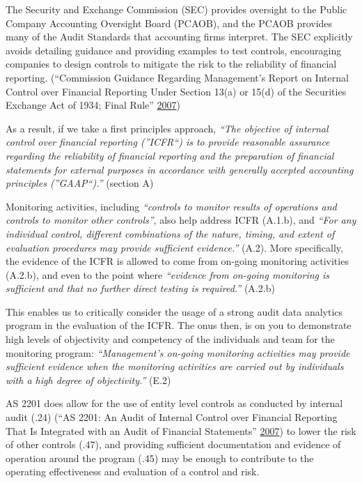 \documentclass[
]{book}
\begin{document}
The Security and Exchange Commission (SEC) provides oversight to the Public Company Accounting Oversight Board (PCAOB), and the PCAOB provides many of the Audit Standards that accounting firms interpret. The SEC explicitly avoids detailing guidance and providing examples to test controls, encouraging companies to design controls to mitigate the risk to the reliability of financial reporting. (``Commission Guidance Regarding Management's Report on Internal Control over Financial Reporting Under Section 13(a) or 15(d) of the Securities Exchange Act of 1934; Final Rule'' \protect\hyperlink{ref-sec-princples-based}{2007})

As a result, if we take a first principles approach, \emph{``The objective of internal control over financial reporting (''ICFR``) is to provide reasonable assurance regarding the reliability of financial reporting and the preparation of financial statements for external purposes in accordance with generally accepted accounting principles (''GAAP``).''} (section A)

Monitoring activities, including \emph{``controls to monitor results of operations and controls to monitor other controls''}, also help address ICFR (A.1.b), and \emph{``For any individual control, different combinations of the nature, timing, and extent of evaluation procedures may provide sufficient evidence.''} (A.2). More specifically, the evidence of the ICFR is allowed to come from on-going monitoring activities (A.2.b), and even to the point where \emph{``evidence from on-going monitoring is sufficient and that no further direct testing is required.''} (A.2.b)

This enables us to critically consider the usage of a strong audit data analytics program in the evaluation of the ICFR. The onus then, is on you to demonstrate high levels of objectivity and competency of the individuals and team for the monitoring program: \emph{``Management's on-going monitoring activities may provide sufficient evidence when the monitoring activities are carried out by individuals with a high degree of objectivity.''} (E.2)

AS 2201 does allow for the use of entity level controls as conducted by internal audit (.24) (``AS 2201: An Audit of Internal Control over Financial Reporting That Is Integrated with an Audit of Financial Statements'' \protect\hyperlink{ref-pcaob-as2201}{2007}) to lower the risk of other controls (.47), and providing sufficient documentation and evidence of operation around the program (.45) may be enough to contribute to the operating effectiveness and evaluation of a control and risk.
\end{document}
